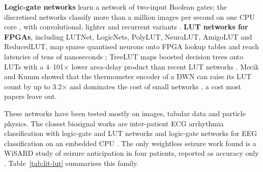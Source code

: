 \textbf{Logic-gate networks} learn a network of two-input Boolean gates; the discretised networks classify more than a
million images per second on one CPU core \cite{petersen2022dlgn}, with convolutional, lighter and recurrent variants
\cite{petersen2024convdlgn,ruttgers2026lightdlgn,buhrer2025rdlgn}. \textbf{LUT networks for FPGAs}, including LUTNet,
LogicNets, PolyLUT, NeuraLUT, AmigoLUT and ReducedLUT, map sparse quantised neurons onto FPGA lookup tables and reach
latencies of tens of nanoseconds \cite{wang2019lutnet,umuroglu2020logicnets,andronic2023polylut,andronic2024neuralut,weng2025amigolut,cassidy2025reducedlut};
TreeLUT maps boosted decision trees onto LUTs with a 4--101$\times$ lower area-delay product than recent LUT networks
\cite{khataei2025treelut}. Mecik and Kumm showed that the thermometer encoder of a DWN can raise its LUT count by up to
3.2$\times$ and dominates the cost of small networks \cite{mecik2025thermo}, a cost most papers leave out.

These networks have been tested mostly on images, tabular data and particle physics. The closest biosignal works are
inter-patient ECG arrhythmia classification with logic-gate and LUT networks \cite{mommen2026ecg} and logic-gate
networks for EEG classification on an embedded CPU \cite{dharia2026eeglgn}. The only weightless seizure work found is a
WiSARD study of seizure anticipation in four patients, reported as accuracy only \cite{deaguiar2015wisard}.
Table~\ref{tab:lit-lut} summarises this family.


